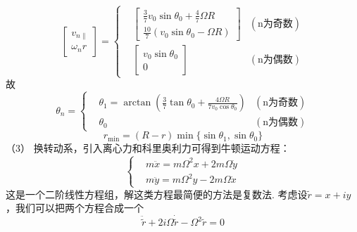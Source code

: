 \documentclass{ctexart}
\begin{document}
    \begin{equation}
        \begin{bmatrix}
            v_{n\parallel}\\
            \omega_nr
        \end{bmatrix}
        =
        \left\{
            \begin{aligned}
                &\begin{bmatrix}
                    \frac{3}{7}v_0\sin\theta_0+\frac{4}{7}\varOmega R \\
                    \frac{10}{7}(v_0\sin\theta_0-\varOmega R)
                \end{bmatrix}&(\text{n为奇数}) \\
                &\begin{bmatrix}
                    v_0\sin\theta_0\\
                    0
                \end{bmatrix}&(\text{n为偶数})
            \end{aligned}
        \right. \tag{5.7}
    \end{equation}
    故
    \begin{equation}
        \theta_n=
        \left\{
            \begin{aligned}
                &\theta_1=\arctan(\frac{3}{7}\tan\theta_0+\frac{4\varOmega R}{7v_0\cos\theta_0})&(\text{n为奇数}) \\
                &\theta_0&(\text{n为偶数})
            \end{aligned}
        \right. \tag{5.8}
    \end{equation}
    \begin{equation}
        r_{\min}=(R-r)\min\{\sin\theta_1,\sin\theta_0\} \tag{5.9}
    \end{equation}
    \noindent     （3）
    换转动系，引入离心力和科里奥利力可得到牛顿运动方程：
    \begin{equation}
        \left\{
        \begin{aligned}
            &m\ddot{x}=m\varOmega^2 x+2m\varOmega \dot{y}\\
            &m\ddot{y}=m\varOmega^2 y-2m\varOmega \dot{x}
        \end{aligned}
        \right. \tag{5.10}
    \end{equation}
这是一个二阶线性方程组，解这类方程最简便的方法是复数法. 考虑设$\tilde{r}=x+iy$，我们可以把两个方程合成一个
\begin{equation}
  \ddot{\tilde{r}}+2i\varOmega \dot{\tilde{r}}-\varOmega^2 \tilde{r}=0 \tag{5.11}
\end{equation}
\end{document}
